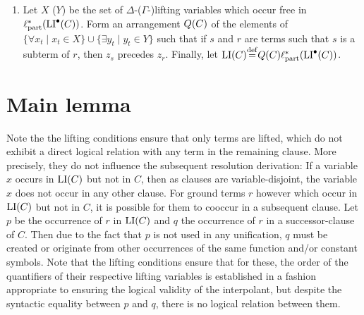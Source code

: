 \begin{defi}
\begin{enumerate}
		\item Let $X$ ($Y$) be the set of $\Delta$-($\Gamma$-)lifting variables which occur free in  
			$\ell_\mathrm{part}^*(\operatorname{LI}^\bullet(C))$.
			Form an arrangement $Q(C)$ of the elements of $\{\forall x_t \mid x_t \in X\}\cup\allowbreak\{\exists y_t \mid y_t \in Y\}$ such that if $s$ and $r$ are terms such that $s$ is a subterm of $r$, then $z_s$ precedes\nolinebreak{} $z_r$.
			Finally, let $\LI(C) \defeq Q(C) \lifsym_\mathrm{part}^*(\LIpre(C))$.
			\qedhere
	\end{enumerate}
\end{defi}






\section{Main lemma}
Note the the lifting conditions ensure that only terms are lifted,
which do not exhibit a direct logical relation with any term in the remaining clause.
More precisely, they do not influence the subsequent resolution derivation: 
If a variable $x$ occurs in $\operatorname{LI}(C)$ but not in $C$, then as clauses are variable-disjoint, the variable $x$ does not occur in any other clause.
For ground terms $r$ however which occur in $\operatorname{LI}(C)$ but not in $C$,
it is possible for them to cooccur in a subsequent clause. Let $p$ be the occurrence of $r$ in $\operatorname{LI}(C)$ and $q$ the occurrence of $r$ in a successor-clause of $C$.
Then due to the fact that $p$ is not used in any unification, 
$q$ must be created or originate from other occurrences of the same function and/or constant symbols.
Note that the lifting conditions ensure that for these, the order of the quantifiers of their respective lifting variables is established in a fashion appropriate to ensuring the logical validity of the interpolant, but despite the syntactic equality between $p$ and $q$, there is no logical relation between them.

